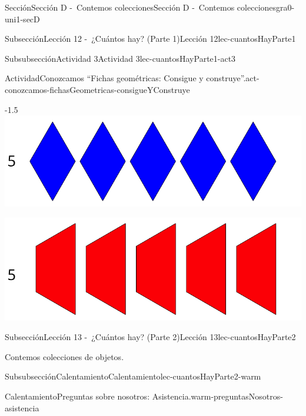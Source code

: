 \documentclass[twoside,10pt,]{article}
\begin{document}
\begin{sectionptx}{Sección}{Sección D -~Contemos colecciones}{}{Sección D -~Contemos colecciones}{}{}{gra0-uni1-secD}
\begin{subsectionptx}{Subsección}{Lección 12 -~¿Cuántos hay? (Parte 1)}{}{Lección 12}{}{}{lec-cuantosHayParte1}
\begin{subsubsectionptx}{Subsubsección}{Actividad 3}{}{Actividad 3}{}{}{lec-cuantosHayParte1-act3}
\begin{activity}{Actividad}{Conozcamos “Fichas geométricas: Consigue y construye”.}{act-conozcamos-fichasGeometricas-consigueYConstruye}%
\begin{image}{0}{1}{0}{-1.5\baselineskip}%
\includegraphics[width=\linewidth]{external/svg-source/tikz-file-148183.pdf}
\end{image}%
\begin{image}{0}{1}{0}{}%
\includegraphics[width=\linewidth]{external/svg-source/tikz-file-148184.pdf}
\end{image}%
\end{activity}%
\end{subsubsectionptx}
\end{subsectionptx}
%
%
\typeout{************************************************}
\typeout{************************************************}
%
\begin{subsectionptx}{Subsección}{Lección 13 -~¿Cuántos hay? (Parte 2)}{}{Lección 13}{}{}{lec-cuantosHayParte2}
\begin{introduction}{}%
Contemos colecciones de objetos.%
\end{introduction}%
%
%
\typeout{************************************************}
\typeout{************************************************}
%
\begin{subsubsectionptx}{Subsubsección}{Calentamiento}{}{Calentamiento}{}{}{lec-cuantosHayParte2-warm}
\begin{exploration}{Calentamiento}{Preguntas sobre nosotros: Asistencia.}{warm-preguntasNosotros-asistencia}%

\end{exploration}
\end{subsubsectionptx}
\end{subsectionptx}
\end{sectionptx}
\end{document}

